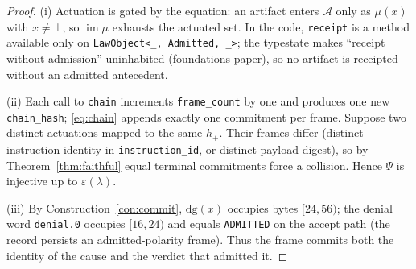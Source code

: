 \documentclass[11pt,oneside]{book}
\theoremstyle{definition}
\theoremstyle{plain}
\theoremstyle{remark}
\newcommand{\Act}{\mathcal{A}}                 %
\newcommand{\muop}{\mu}                        %
\newcommand{\Rfsl}{\bot}                        %
\newcommand{\dg}{\mathrm{dg}}                   %
\DeclareMathOperator{\im}{im}
\newcommand{\code}[1]{\texttt{#1}}
\begin{document}
\begin{proof}
(i) Actuation is gated by the equation: an artifact enters $\Act$ only as $\muop(x)$ with $x\ne\Rfsl$, so $\im\muop$ exhausts the actuated set. %
In the code, \code{receipt} is a method available only on \code{LawObject<\_, Admitted, \_>}; the typestate makes ``receipt without admission'' uninhabited (foundations paper), so no artifact is receipted without an admitted antecedent. %

(ii) Each call to \code{chain} increments \code{frame\_count} by one and produces one new \code{chain\_hash}; \eqref{eq:chain} appends exactly one commitment per frame. %
Suppose two distinct actuations mapped to the same $h_{+}$. %
Their frames differ (distinct instruction identity in \code{instruction\_id}, or distinct payload digest), so by Theorem~\ref{thm:faithful} equal terminal commitments force a collision. %
Hence $\Psi$ is injective up to $\varepsilon(\lambda)$. %

(iii) By Construction~\ref{con:commit}, $\dg(x)$ occupies bytes $[24,56)$; the denial word \code{denial.0} occupies $[16,24)$ and equals \code{ADMITTED} on the accept path (the record persists an admitted-polarity frame). %
Thus the frame commits both the identity of the cause and the verdict that admitted it. %
\end{proof} %
\end{document}
